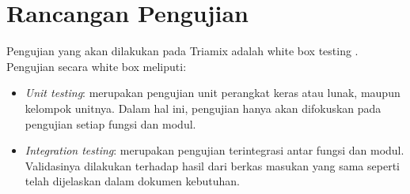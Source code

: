 \documentclass[a4paper,11pt]{report}
\newcommand{\putpdf}[1]{}
\begin{document}
\chapter{Rancangan Pengujian}
Pengujian yang akan dilakukan pada Triamix adalah white box testing \cite{whitebox,iso}. Pengujian secara white box meliputi:
\begin{itemize}
  \item \textit{Unit testing}: merupakan pengujian unit perangkat keras atau lunak, maupun kelompok unitnya. Dalam hal ini, pengujian hanya akan difokuskan pada pengujian setiap fungsi dan modul.
  \item \textit{Integration testing}: merupakan pengujian terintegrasi antar fungsi dan modul. Validasinya dilakukan terhadap hasil dari berkas masukan yang sama seperti telah dijelaskan dalam dokumen kebutuhan.
\end{itemize}



\begin{appendix}
	
	\setcounter{page}{2}
%	
\putpdf{THERMIXInputManual}
\end{appendix}
\end{document}
